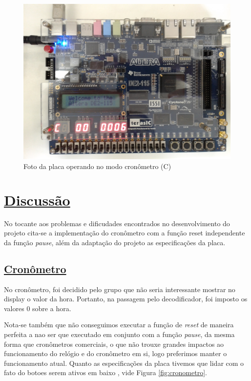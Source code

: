 \documentclass[14pt, oneside]{book}
\newcommand\tab[1][1cm]{\hspace*{#1}}
\theoremstyle{definition}
\begin{document}
                \begin{figure}[H]
                    \centering
                    \includegraphics[width=\columnwidth]{foto_placa_C.jpg}
                    \caption{Foto da placa operando no modo cronômetro (C)}
                    \label{foto_cronometro}
                \end{figure}
         
         
         
         
            
        \chapter[Discussão]{\hyperlink{toc}{Discussão}} \hypertarget{ana}{}
            \tab No tocante aos problemas e dificudades encontrados no desenvolvimento do projeto cita-se a implementação do cronômetro com a função reset independente da função \textit{pause}, além da adaptação do projeto as especificações da placa.
            \section[Cronômetro]{\hyperlink{toc}{Cronômetro}}
                
                 \tab No cronômetro, foi decidido pelo grupo que não seria interessante mostrar no display o valor da hora. Portanto, na passagem pelo decodificador, foi imposto os valores $0$ sobre a hora.
                
                \tab Nota-se também que não conseguimos executar a função de \textit{reset} de maneira perfeita a nao ser que executado em conjunto com a função \textit{pause}, da mesma forma que cronômetros comerciais, o que não trouxe grandes impactos ao funcionamento do relógio e do cronômetro em si, logo preferimos manter o funcionamento atual. Quanto as especificações da placa tivemos que lidar com o fato do botoes serem ativos em baixo , vide Figura \ref{fig:cronometro}. \\
                
\end{document}
